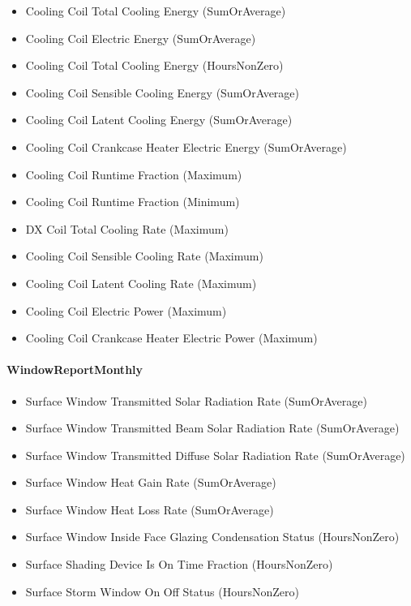 \begin{itemize}
\item
  Cooling Coil Total Cooling Energy (SumOrAverage)
\item
  Cooling Coil Electric Energy (SumOrAverage)
\item
  Cooling Coil Total Cooling Energy (HoursNonZero)
\item
  Cooling Coil Sensible Cooling Energy (SumOrAverage)
\item
  Cooling Coil Latent Cooling Energy (SumOrAverage)
\item
  Cooling Coil Crankcase Heater Electric Energy (SumOrAverage)
\item
  Cooling Coil Runtime Fraction (Maximum)
\item
  Cooling Coil Runtime Fraction (Minimum)
\item
  DX Coil Total Cooling Rate (Maximum)
\item
  Cooling Coil Sensible Cooling Rate (Maximum)
\item
  Cooling Coil Latent Cooling Rate (Maximum)
\item
  Cooling Coil Electric Power (Maximum)
\item
  Cooling Coil Crankcase Heater Electric Power (Maximum)
\end{itemize}

\paragraph{WindowReportMonthly}\label{windowreportmonthly}

\begin{itemize}
\item
  Surface Window Transmitted Solar Radiation Rate (SumOrAverage)
\item
  Surface Window Transmitted Beam Solar Radiation Rate (SumOrAverage)
\item
  Surface Window Transmitted Diffuse Solar Radiation Rate (SumOrAverage)
\item
  Surface Window Heat Gain Rate (SumOrAverage)
\item
  Surface Window Heat Loss Rate (SumOrAverage)
\item
  Surface Window Inside Face Glazing Condensation Status (HoursNonZero)
\item
  Surface Shading Device Is On Time Fraction (HoursNonZero)
\item
  Surface Storm Window On Off Status (HoursNonZero)
\end{itemize}

